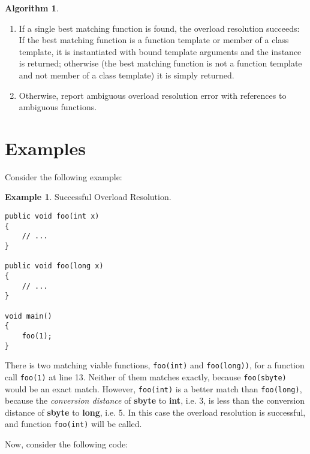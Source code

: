 \documentclass[a4paper,oneside,11pt]{book}
\theoremstyle{definition}
\newtheorem{exmp}{Example}[section]
\newtheorem{algo}{Algorithm}[section]
\begin{document}
\begin{algo}
\begin{enumerate}
\begin{enumerate}
\begin{enumerate}
\item
If a single best matching function is found, the overload resolution succeeds:
If the best matching function is a function template or member of a class template, it is instantiated with bound template arguments
and the instance is returned; otherwise (the best matching function is not a function template and not member of a class template) it is simply returned.
\item
Otherwise, report ambiguous overload resolution error with references to ambiguous functions.
\end{enumerate}
\end{enumerate}
\end{enumerate}
\end{algo}

\section{Examples}

Consider the following example:

\begin{exmp} Successful Overload Resolution.
\lstset{language=Cmajor}
\begin{lstlisting}[frame=trBL]
public void foo(int x)
{
    // ...
}

public void foo(long x)
{
    // ...
}

void main()
{
    foo(1);
}
\end{lstlisting}

There is two matching viable functions, \verb|foo(int)| and \verb|foo(long))|, for a function call \verb|foo(1)| at line 13.
Neither of them matches exactly, because \verb|foo(sbyte)| would be an exact match.
However, \verb|foo(int)| is a better match than \verb|foo(long)|, because the \emph{conversion distance} of \textbf{sbyte} to \textbf{int}, i.e. 3, is less than
the conversion distance of \textbf{sbyte} to \textbf{long}, i.e. 5.
In this case the overload resolution is successful, and function \verb|foo(int)| will be called.
\end{exmp}

Now, consider the following code:
\end{document}
